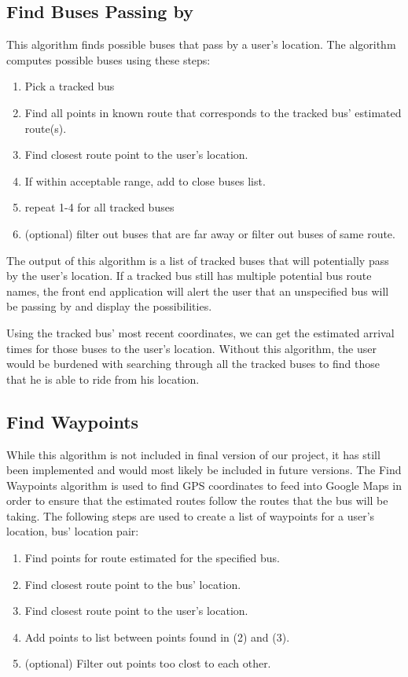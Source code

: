 \documentclass[pageno]{jpaper}
\begin{document}
\subsection{Find Buses Passing by}

This algorithm finds possible buses that pass by a user's location.  
The algorithm computes possible buses using these steps:

\begin{enumerate}
    \item Pick a tracked bus
    \item Find all points in known route that corresponds
            to the tracked bus' estimated route(s).
    \item Find closest route point to the user's location.
    \item If within acceptable range, add to close buses list.
    \item repeat 1-4 for all tracked buses
    \item (optional) filter out buses that are far away or 
            filter out buses of same route.
\end{enumerate}

The output of this algorithm is a list of tracked buses that 
will potentially pass by the user's location. If a tracked bus 
still has multiple potential bus route names, the front end 
application will alert the user that an unspecified bus will be 
passing by and display the possibilities.

Using the tracked bus' most recent coordinates, we can get 
the estimated arrival times for those buses to 
the user's location.  Without this algorithm, the user would 
be burdened with searching through all the tracked buses to 
find those that he is able to ride from his location.

\subsection{Find Waypoints}
While this algorithm is not included in final version of our 
project, it has still been implemented and would most likely 
be included in future versions.  The Find Waypoints algorithm 
is used to find GPS coordinates to feed into Google Maps 
in order to ensure that the estimated routes follow the routes 
that the bus will be taking.  The following steps are used to 
create a list of waypoints for a {user's location, bus' location} 
pair:

\begin{enumerate}
    \item Find points for route estimated for the specified bus.
    \item Find closest route point to the bus' location.
    \item Find closest route point to the user's location.
    \item Add points to list between points found in (2) and (3).
    \item (optional) Filter out points too clost to each other.
\end{enumerate}
\end{document}
